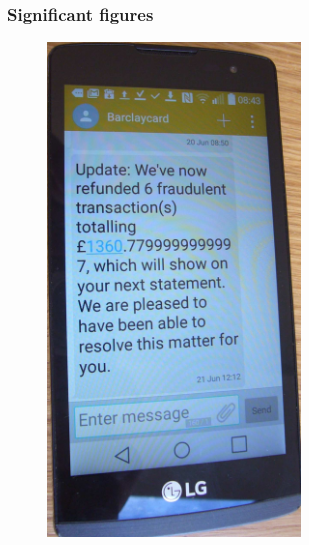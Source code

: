 \documentclass[notes]{beamer}
\begin{document}
\begin{frame}
	\frametitle{Significant figures}
	\begin{minipage}[t]{0.45\linewidth}
	\begin{figure}[ht]
		\centering
		\includegraphics[width=0.6\textwidth]{figs/banking.png}
	\end{figure}
	\end{minipage}%
	\hfill%
	\begin{minipage}[t]{0.45\linewidth}
	\begin{figure}[ht]
		\centering

\end{figure}
\end{minipage}
\end{frame}
\end{document}
